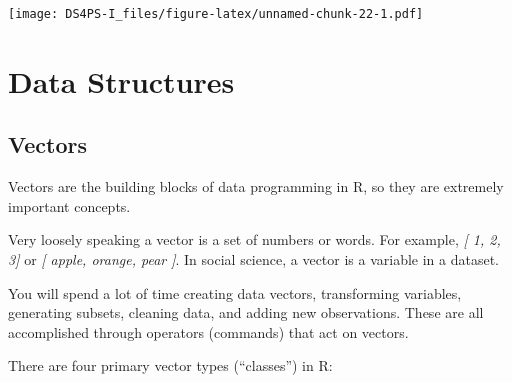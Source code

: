 \documentclass[]{book}
\theoremstyle{definition}
\theoremstyle{definition}
\theoremstyle{definition}
\theoremstyle{remark}
\begin{document}
\texttt{[image: DS4PS-I\_files/figure-latex/unnamed-chunk-22-1.pdf]}

\hypertarget{data-structures}{%
\chapter{Data Structures}\label{data-structures}}

\hypertarget{vectors}{%
\section{Vectors}\label{vectors}}

Vectors are the building blocks of data programming in R, so they are
extremely important concepts.

Very loosely speaking a vector is a set of numbers or words. For
example, \emph{{[} 1, 2, 3{]}} or \emph{{[} apple, orange, pear {]}}. In
social science, a vector is a variable in a dataset.

You will spend a lot of time creating data vectors, transforming
variables, generating subsets, cleaning data, and adding new
observations. These are all accomplished through operators (commands)
that act on vectors.

There are four primary vector types (``classes'') in R:
\end{document}
